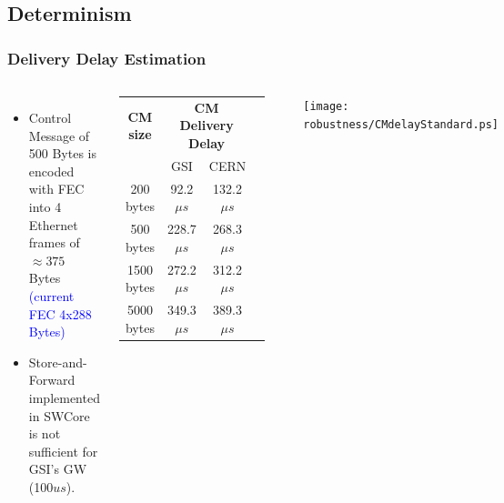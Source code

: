 \documentclass[]{beamer}
\begin{document}
\subsection{Determinism}
\begin{frame}
  \frametitle{Delivery Delay Estimation}   


  \begin{columns}[c]
  \column{2.5in}  %
  \begin{itemize}
  \item Control Message of 500 Bytes is encoded with FEC into 4 Ethernet frames
        of $\approx375$ Bytes \textcolor{blue}{(current FEC 4x288 Bytes)}
  \item Store-and-Forward implemented in SWCore is not sufficient for GSI's GW
        (100$us$).
  \end{itemize}

  {\tiny
  \begin{table}[ht]
  \centering
	  \begin{tabular}{| c | c | c | c |}          \hline
  \textbf{CM size}& \multicolumn{2}{|c|}{\textbf{CM Delivery Delay}}\\
		 &    GSI           & CERN          \\ \hline
  200 bytes      &  92.2$\mu s$    & 132.2$\mu s$    \\ \hline
  500 bytes      & 228.7$\mu s$    & 268.3$\mu s$    \\ \hline
  1500 bytes     & 272.2$\mu s$    & 312.2$\mu s$    \\ \hline
  5000 bytes     & 349.3$\mu s$    & 389.3$\mu s$    \\ \hline
  \end{tabular}
  \label{tab:CMspDelay}
  \end{table}
 }

  \column{3in}

  \texttt{[image: robustness/CMdelayStandard.ps]}

  \end{columns}



\end{frame}
% 
\end{document}
